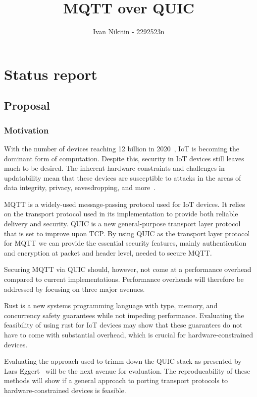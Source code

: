 \documentclass[11pt]{article}
\title{MQTT over QUIC}
\author{Ivan Nikitin - 2292523n}
\begin{document}
    \maketitle
    
    
     

\section{Status report}

\subsection{Proposal}\label{proposal}

\subsubsection{Motivation}\label{motivation}

With the number of devices reaching 12 billion in 2020~\cite{noauthor_state_2020}, IoT is becoming the dominant form of computation.
Despite this, security in IoT devices still leaves much to be desired.
The inherent hardware constraints and challenges in updatability mean that these devices are susceptible to attacks in the areas of data integrity, privacy, eavesdropping, and more~\cite{alaba_internet_2017}.

MQTT is a widely-used message-passing protocol used for IoT devices.
It relies on the transport protocol used in its implementation to provide both reliable delivery and security.
QUIC is a new general-purpose transport layer protocol that is set to improve upon TCP.
By using QUIC as the transport layer protocol for MQTT we can provide the essential security features, mainly authentication and encryption at packet and header level, needed to secure MQTT.

Securing MQTT via QUIC should, however, not come at a performance overhead compared to current implementations.
Performance overheads will therefore be addressed by focusing on three major avenues.

Rust is a new systems programming language with type, memory, and concurrency safety guarantees while not impeding performance.
Evaluating the feasibility of using rust for IoT devices may show that these guarantees do not have to come with substantial overhead, which is crucial for hardware-constrained devices.

Evaluating the approach used to trimm down the QUIC stack as presented by Lars Eggert~\cite{eggert_towards_2020} will be the next avenue for evaluation.
The reproducability of these methods will show if a general approach to porting transport protocols to hardware-constrained devices is feasible. 
\end{document}
